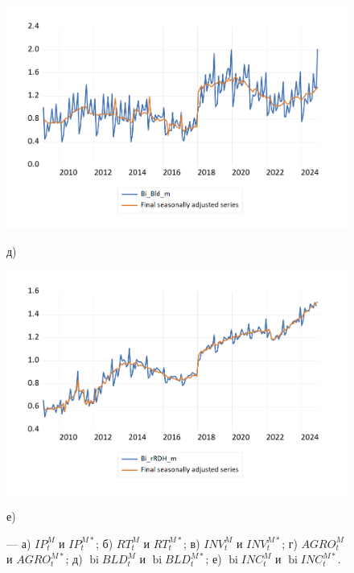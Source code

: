 \documentclass[a4paper, 14pt]{extreport}
\numberwithin{equation}{section}
\newcommand{\bi}{\operatorname{bi}}
\numberwithin{equation}{section}
\begin{document}
\begin{figure}[h!]
	\begin{minipage}{0.5\textwidth}
		\centering
		\includegraphics[scale=0.4]{images/image20}
		\caption*{д)}
	\end{minipage}%
	\hfill %
	\begin{minipage}{0.5\textwidth}
		\centering
		\includegraphics[scale=0.4]{images/image21}
		\caption*{е)}
	\end{minipage}
	
	\caption{\centering --- а) $IP_t^M$ и $IP_t^{M*}$; б) $RT_t^M$ и $RT_t^{M*}$; в) $INV_t^M$ и $INV_t^{M*}$; г) $AGRO_t^M$ и $AGRO_t^{M*}$; д) $\bi BLD_t^M$ и $\bi BLD_t^{M*}$; е) $\bi INC_t^M$ и $\bi INC_t^{M*}$.}
	\label{fig:ts-2}
\end{figure}
	
\end{document}
